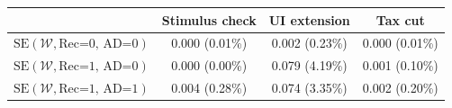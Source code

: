 \begin{tabular}{@{}lccc@{}}
\toprule
                          & Stimulus check      & UI extension    & Tax cut    \\  \midrule
$\mathrm{SE}(\mathcal{W}, \text{Rec=0, AD=0})$ & 0.000 (0.01\%)  & 0.002 (0.23\%)  & 0.000 (0.01\%)     \\
$\mathrm{SE}(\mathcal{W}, \text{Rec=1, AD=0})$ & 0.000 (0.00\%)  & 0.079 (4.19\%)  & 0.001 (0.10\%)     \\
$\mathrm{SE}(\mathcal{W}, \text{Rec=1, AD=1})$ & 0.004 (0.28\%)  & 0.074 (3.35\%)  & 0.002 (0.20\%)     \\ \bottomrule
\end{tabular}
